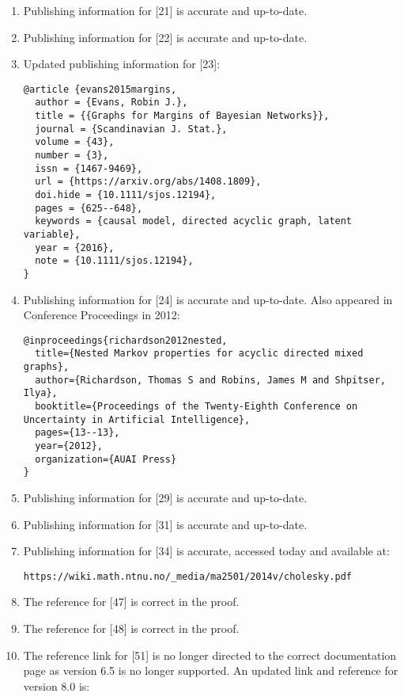 \documentclass{article}
\begin{document}
\begin{enumerate}
\begin{verbatim}
}
        \end{verbatim}
        \item Publishing information for [21] is accurate and up-to-date.
        \item Publishing information for [22] is accurate and up-to-date.
        \item Updated publishing information for [23]:
        \begin{verbatim}
@article {evans2015margins,
  author = {Evans, Robin J.},
  title = {{Graphs for Margins of Bayesian Networks}},
  journal = {Scandinavian J. Stat.},
  volume = {43},
  number = {3},
  issn = {1467-9469},
  url = {https://arxiv.org/abs/1408.1809},
  doi.hide = {10.1111/sjos.12194},
  pages = {625--648},
  keywords = {causal model, directed acyclic graph, latent variable},
  year = {2016},
  note = {10.1111/sjos.12194},
}
        \end{verbatim}
        \item Publishing information for [24] is accurate and up-to-date. Also appeared in Conference Proceedings in 2012:
        \begin{verbatim}
@inproceedings{richardson2012nested,
  title={Nested Markov properties for acyclic directed mixed graphs},
  author={Richardson, Thomas S and Robins, James M and Shpitser, Ilya},
  booktitle={Proceedings of the Twenty-Eighth Conference on Uncertainty in Artificial Intelligence},
  pages={13--13},
  year={2012},
  organization={AUAI Press}
}
        \end{verbatim}
        \item Publishing information for [29] is accurate and up-to-date.
        \item Publishing information for [31] is accurate and up-to-date.
        \item Publishing information for [34] is accurate, accessed today and available at:
        \begin{verbatim}
https://wiki.math.ntnu.no/_media/ma2501/2014v/cholesky.pdf
        \end{verbatim}
        \item The reference for [47] is correct in the proof.
        \item The reference for [48] is correct in the proof.
        \item The reference link for [51] is no longer directed to the correct documentation page as version 6.5 is no longer supported. An updated link and reference for version 8.0 is:
        \begin{verbatim}

\end{verbatim}
\end{enumerate}
\end{document}
